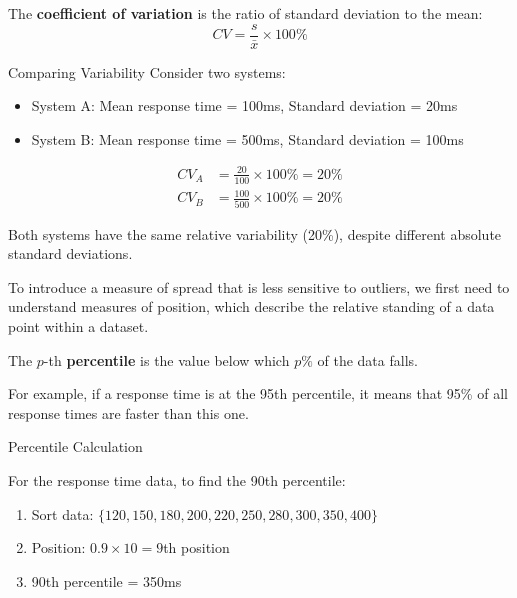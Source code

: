 \begin{definition}
The \textbf{coefficient of variation} is the ratio of standard deviation to the mean:
\[
CV = \frac{s}{\bar{x}} \times 100\%
\]
\end{definition}

\begin{example} Comparing Variability
Consider two systems:
\begin{itemize}
    \item System A: Mean response time = 100ms, Standard deviation = 20ms
    \item System B: Mean response time = 500ms, Standard deviation = 100ms
\end{itemize}

\begin{align*}
CV_A &= \frac{20}{100} \times 100\% = 20\% \\
CV_B &= \frac{100}{500} \times 100\% = 20\%
\end{align*}

Both systems have the same relative variability (20\%), despite different absolute standard deviations.
\end{example}

To introduce a measure of spread that is less sensitive to outliers, we first need to understand measures of position, which describe the relative standing of a data point within a dataset.

\begin{definition}[Percentile]
The $p$-th \textbf{percentile} is the value below which $p\%$ of the data falls.
\end{definition}

For example, if a response time is at the 95th percentile, it means that 95\% of all response times are faster than this one.

\begin{example} Percentile Calculation

    For the response time data, to find the 90th percentile:
\begin{enumerate}
        \item Sort data: $\{120, 150, 180, 200, 220, 250, 280, 300, 350, 400\}$
        \item Position: $0.9 \times 10 = 9$th position
        \item 90th percentile = 350ms
\end{enumerate}
    \end{example}

